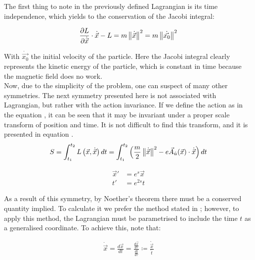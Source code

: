 The first thing to note in the previously defined Lagrangian is its time independence, which yields to the conservation of the Jacobi integral:

\begin{equation*}
 \frac{\partial L}{\partial\dot{\vec{x}}}\cdot\dot{\vec{x}} - L = m\left\lVert \dot{\vec{x}} \right\rVert^2                    =m\left\lVert \dot{\vec{x_0}} \right\rVert^2 
\end{equation*}

With $\dot{\vec{x_0}}$ the initial velocity of the particle. Here the Jacobi integral clearly represents the kinetic energy of the particle, which is constant in time because the magnetic field does no work.\\

Now, due to the simplicity of the problem, one can suspect of many other symmetries. The next symmetry presented here is not associated with Lagrangian, but rather with the action invariance. If we define the action as in the equation , it can be seen that it may be invariant under a proper scale transform of position and time. It is not difficult to find this transform, and it is presented in equation .\\

\begin{equation}
S = \int_{t_1}^{t_2}L\left( \vec{x},\dot{\vec{x}} \right)dt = \int_{t_1}^{t_2}\left( \frac{m}{2}\left\lVert \dot{\vec{x}} \right\rVert^2 - e\vec{A}_{\hat{u}}(\vec{x})\cdot\dot{\vec{x}} \right)dt 
\label{eq:action}
\end{equation}

\begin{equation}
\begin{aligned}
\vec{x}' &= e^{s}\vec{x}\\
t'&= e^{2s}t
\end{aligned}
\label{eq:scaletrans}
\end{equation}

As a result of this symmetry, by Noether's theorem there must be a conserved quantity implied. To calculate it we prefer the method stated in \cite[Thm (dontforget)]{scheck}; however, to apply this method, the Lagrangian must be parametrised to include the time $t$ as a generalised coordinate. To achieve this, note that:

\begin{align*}
\dot{\vec{x}} = \frac{d\vec{x}}{dt} = \frac{\frac{d\vec{x}}{d\tau}}{\frac{dt}{d\tau}} \coloneqq \frac{\mathring{\vec{x}}}{\mathring{t}}
\end{align*}

